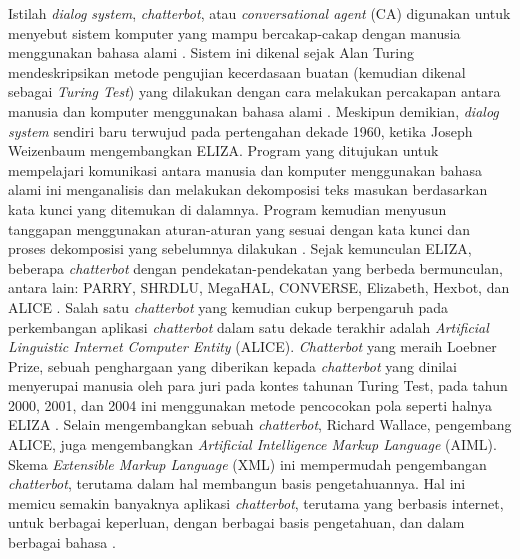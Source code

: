 Istilah \textit{dialog system}, \textit{chatterbot}, atau \textit{conversational agent} (CA) digunakan untuk menyebut sistem komputer yang mampu bercakap-cakap dengan manusia menggunakan bahasa alami \cite{shawar2007}. Sistem ini dikenal sejak Alan Turing mendeskripsikan metode pengujian kecerdasaan buatan (kemudian dikenal sebagai \textit{Turing Test}) yang dilakukan dengan cara melakukan percakapan antara manusia dan komputer menggunakan bahasa alami \cite{turing1950}. Meskipun demikian, \textit{dialog system} sendiri baru terwujud pada pertengahan dekade 1960, ketika Joseph Weizenbaum mengembangkan ELIZA. Program yang ditujukan untuk mempelajari komunikasi antara manusia dan komputer menggunakan bahasa alami ini menganalisis dan melakukan dekomposisi teks masukan berdasarkan kata kunci yang ditemukan di dalamnya. Program kemudian menyusun tanggapan menggunakan aturan-aturan yang sesuai dengan kata kunci dan proses dekomposisi yang sebelumnya dilakukan \cite{weizenbaum1966, jurafsky2009}. Sejak kemunculan ELIZA, beberapa \textit{chatterbot} dengan pendekatan-pendekatan yang berbeda bermunculan, antara lain: PARRY, SHRDLU, MegaHAL, CONVERSE, Elizabeth, Hexbot, dan ALICE \cite{shawar2007, stephens-}. Salah satu \textit{chatterbot} yang kemudian cukup berpengaruh pada perkembangan aplikasi \textit{chatterbot} dalam satu dekade terakhir adalah \textit{Artificial Linguistic Internet Computer Entity} (ALICE). \textit{Chatterbot} yang meraih Loebner Prize, sebuah penghargaan yang diberikan kepada \textit{chatterbot} yang dinilai menyerupai manusia oleh para juri pada kontes tahunan Turing Test, pada tahun 2000, 2001, dan 2004 ini menggunakan metode pencocokan pola seperti halnya ELIZA \cite{wallace2009, loebner2011}. Selain mengembangkan sebuah \textit{chatterbot}, Richard Wallace, pengembang ALICE, juga mengembangkan \textit{Artificial Intelligence Markup Language} (AIML). Skema \textit{Extensible Markup Language} (XML) ini mempermudah pengembangan \textit{chatterbot}, terutama dalam hal membangun basis pengetahuannya. Hal ini memicu semakin banyaknya aplikasi \textit{chatterbot}, terutama yang berbasis internet, untuk berbagai keperluan, dengan berbagai basis pengetahuan, dan dalam berbagai bahasa \cite{wallace2003, gasperis2010, alice2011}.


